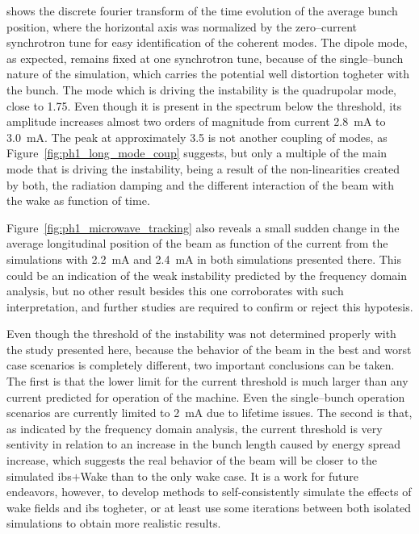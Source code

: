     shows the discrete fourier transform of the time evolution of the average bunch position, where the horizontal axis was normalized by the zero--current synchrotron tune for easy identification of the coherent modes. The dipole mode, as expected, remains fixed at one synchrotron tune, because of the single--bunch nature of the simulation, which carries the potential well distortion togheter with the bunch.
    The mode which is driving the instability is the quadrupolar mode, close to \num{1.75}. Even though it is present in the spectrum below the threshold, its amplitude increases almost two orders of magnitude from current \SI{2.8}{\milli\ampere} to \SI{3.0}{\milli\ampere}. The peak at approximately \num{3.5} is not another coupling of modes, as Figure~\ref{fig:ph1_long_mode_coup} suggests, but only a multiple of the main mode that is driving the instability, being a result of the non-linearities created by both, the radiation damping and the different interaction of the beam with the wake as function of time.

    Figure~\ref{fig:ph1_microwave_tracking} also reveals a small sudden change in the average longitudinal position of the beam as function of the current from the simulations with \SI{2.2}{\milli\ampere} and \SI{2.4}{\milli\ampere} in both simulations presented there. This could be an indication of the weak instability predicted by the frequency domain analysis, but no other result besides this one corroborates with such interpretation, and further studies are required to confirm or reject this hypotesis.

    Even though the threshold of the instability was not determined properly with the study presented here, because the behavior of the beam in the best and worst case scenarios is completely different, two important conclusions can be taken. The first is that the lower limit for the current threshold is much larger than any current predicted for operation of the machine. Even the single--bunch operation scenarios are currently limited to \SI{2}{\milli\ampere} due to lifetime issues. The second is that, as indicated by the frequency domain analysis, the current threshold is very sentivity in relation to an increase in the bunch length caused by energy spread increase, which suggests the real behavior of the beam will be closer to the simulated \gls{ibs}$+$Wake than to the only wake case. It is a work for future endeavors, however, to develop methods to self-consistently simulate the effects of wake fields and \gls{ibs} togheter, or at least use some iterations between both isolated simulations to obtain more realistic results.

